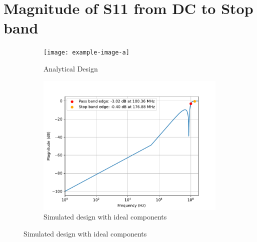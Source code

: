 \documentclass[letterpaper,12pt]{article}
\begin{document}
\section{Magnitude of S11 from DC to Stop band}
\begin{figure}[H]
    \begin{subfigure}[t]{.49\textwidth}
      \centering
      \texttt{[image: example-image-a]}
      \caption{Analytical Design}
    \end{subfigure}
    \hfill
    \begin{subfigure}[t]{.49\textwidth}
      \centering
      \includegraphics[width=\linewidth]{figures/7.ideal}
      \caption{Simulated design with ideal components}
    \end{subfigure}
  
    \medskip
  

\end{figure}
\end{document}
